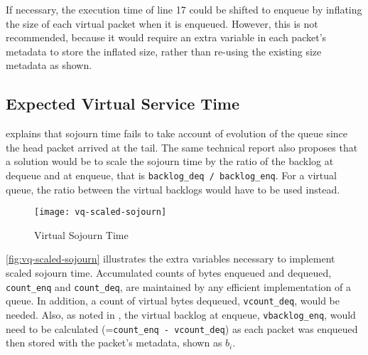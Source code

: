 If necessary, the execution time of line 17 could be shifted to enqueue by inflating the size of each virtual packet when it is enqueued. However, this is not recommended, because it would require an extra variable in each packet's metadata to store the inflated size, rather than re-using the existing size metadata as shown.

\subsection{Expected Virtual Service Time}\label{l4saqmtr_vq-sojourn-scaled}

\cite{Briscoe17b:sigqdyn_TR} explains that sojourn time fails to take account of evolution of the queue since the head packet arrived at the tail. The same technical report also proposes that a solution would be to scale the sojourn time by the ratio of the backlog at dequeue and at enqueue, that is \texttt{backlog\_deq / backlog\_enq}. For a virtual queue, the ratio between the virtual backlogs would have to be used instead. 

\begin{figure}[h]
	\centering
	\texttt{[image: vq-scaled-sojourn]}
	\caption{Virtual Sojourn Time}\label{fig:vq-scaled-sojourn}
\end{figure}

\autoref{fig:vq-scaled-sojourn} illustrates the extra variables necessary to implement scaled sojourn time. Accumulated counts of bytes enqueued and dequeued, \texttt{count\_enq} and \texttt{count\_deq}, are maintained by any efficient implementation of a queue. In addition, a count of virtual bytes dequeued, \texttt{vcount\_deq}, would be needed. Also, as noted in \cite{Briscoe17b:sigqdyn_TR}, the virtual backlog at enqueue,  \texttt{vbacklog\_enq}, would need to be calculated  (=\texttt{count\_enq - vcount\_deq}) as each packet was enqueued then stored with the packet's metadata, shown as \(b_i\). 

